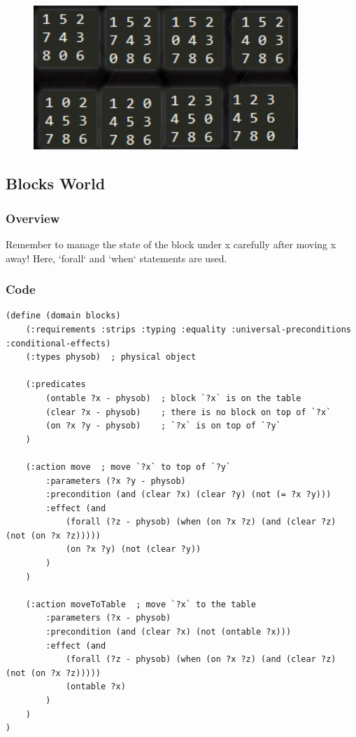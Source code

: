 ﻿\documentclass[a4paper, 11pt]{article}
\begin{document}
\begin{figure}[h]
  \centering
  \includegraphics[width=10cm]{Pic/puzzleresult.png}
\end{figure}

\subsection{Blocks World}
\subsubsection{Overview}
Remember to manage the state of the block under x carefully after moving x away! Here, `forall` and `when` statements are used.

\subsubsection{Code}
\begin{lstlisting}[title=domain\_blocks.pddl]
(define (domain blocks)
    (:requirements :strips :typing :equality :universal-preconditions :conditional-effects)
    (:types physob)  ; physical object

    (:predicates
        (ontable ?x - physob)  ; block `?x` is on the table
        (clear ?x - physob)    ; there is no block on top of `?x`
        (on ?x ?y - physob)    ; `?x` is on top of `?y`
    )

    (:action move  ; move `?x` to top of `?y`
        :parameters (?x ?y - physob)
        :precondition (and (clear ?x) (clear ?y) (not (= ?x ?y)))
        :effect (and
            (forall (?z - physob) (when (on ?x ?z) (and (clear ?z) (not (on ?x ?z)))))
            (on ?x ?y) (not (clear ?y))
        )
    )

    (:action moveToTable  ; move `?x` to the table
        :parameters (?x - physob)
        :precondition (and (clear ?x) (not (ontable ?x)))
        :effect (and
            (forall (?z - physob) (when (on ?x ?z) (and (clear ?z) (not (on ?x ?z)))))
            (ontable ?x)
        )
    )
)
\end{lstlisting}
\end{document}

